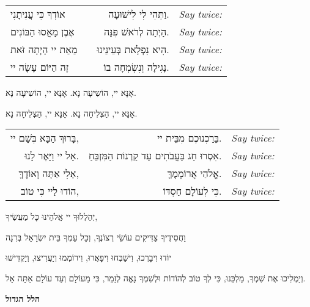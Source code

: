 {\begin{center}
\begin{tabular}{l p{2em} r l}
אוֹדְךָ כִּי עֲנִיתָנִי & &
וַתְּהִי לִי לִישׁוּעָה. &
\textenglish{\itshape Say twice:} \\
אֶבֶן מָאֲסוּ הַבּוֹנִים & &
הָיְתָה לְרֹאשׁ פִּנָּה. &
\textenglish{\itshape Say twice:} \\
מֵאֵת יי הָיְתָה זֹּאת & &
הִיא נִפְלָאת בְּעֵינֵינוּ. &
\textenglish{\itshape Say twice:} \\
זֶה הַיּוֹם עָשָׂה יי & &
נָגִילָה וְנִשְׂמְחָה בוֹ. &
\textenglish{\itshape Say twice:} \\
\end{tabular}
\end{center}


\begin{center}
{\Large
אָנָּא יי, הוֹשִיעָה נָּא. 
\hspace{2em}
אָנָּא יי, הוֹשִיעָה נָּא.

אָנָּא יי, הַצְלִיחָה נָא.
\hspace{2em}
אָנָּא יי, הַצְלִיחָה נָא.
}

\vspace{2em}

\begin{tabular}{r r l}
בָּרוּךְ הַבָּא בְּשֵׁם יי, & 
בֵּרַכְנוּכֶם מִבֵּית יי. &
\textenglish{\itshape Say twice:} \\
אֵל יי וַיָּאֶר לָנוּ. &
אִסְרוּ חַג בַּעֲבֹתִים עַד קַרְנוֹת הַמִּזְבֵּחַ. &
\textenglish{\itshape Say twice:} \\
אֵלִי אַתָּה וְאוֹדֶךָּ, &
אֱלֹהַי אֲרוֹמְמֶךָּ.&
\textenglish{\itshape Say twice:} \\
הוֹדוּ לַיי כִּי טוֹב, &
כִּי לְעוֹלָם חַסְדּוֹ. &
\textenglish{\itshape Say twice:} \\
\end{tabular}

\end{center}

}

\begin{center}
יְהַלְלוּךָ יי אֱלֹהֵינוּ כָּל מַעֲשֶׂיךָ, 

וַחֲסִידֶיךָ צַדִּיקִים עוֹשֵׂי רְצוֹנֶךָ, וְכָל עַמְךָ בֵּית יִשְׂרָאֵל בְּרִנָה 

יוֹדוּ 
\hspace{0.5em}
וִיבָרְכוּ, 
\hspace{0.5em}
וִישַׁבְּחוּ 
\hspace{0.5em}
וִיפָאֲרוּ, 
\hspace{0.5em}
וִירוֹמְמוּ 
\hspace{0.5em}
וְיַעֲרִיצוּ, 
\hspace{0.5em}
וְיַקְדִּישׁוּ 

וְיַמְלִיכוּ אֶת שִׁמְךָ, מַלְכֵּנוּ, כִּי לְךָ טוֹב לְהוֹדוֹת וּלְשִׁמְךָ נָאֱה לְזַמֵר, כִּי מֵעוֹלָם וְעַד עוֹלָם אַתָּה אֵל.

\vspace{0.5em}

{\large \bfseries \textcolor{light-gray}{
הלל הגדול
}}
\end{center}

